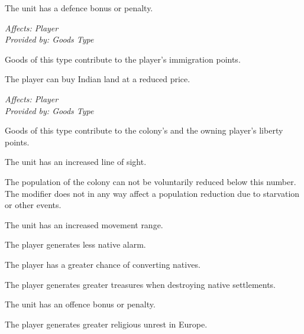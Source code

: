 \documentclass[12pt]{book}
\begin{document}
\affectsUnit

The unit has a defence bonus or penalty.

\textit{Affects: Player\\Provided by: Goods Type}

Goods of this type contribute to the player's immigration points.

\affectsPlayer

The player can buy Indian land at a reduced price.

\textit{Affects: Player\\Provided by: Goods Type}

Goods of this type contribute to the colony's and the owning player's
liberty points.

\affectsUnit

The unit has an increased line of sight.

\affectsColonyTwo

The population of the colony can not be voluntarily reduced below this
number. The modifier does not in any way affect a population reduction
due to starvation or other events.

\affectsUnit

The unit has an increased movement range.

\affectsPlayer

The player generates less native alarm.

\affectsPlayer

The player has a greater chance of converting natives.

\affectsPlayer

The player generates greater treasures when destroying native settlements.

\affectsUnit

The unit has an offence bonus or penalty.

\affectsPlayer

The player generates greater religious unrest in Europe.

\affectsUnit
\end{document}
